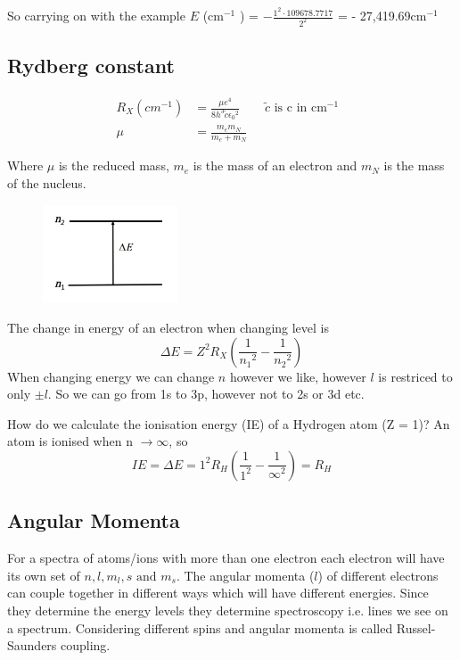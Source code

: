 \documentclass{article}
\newcommand{\cm}{cm\(^{-1}\) }
\begin{document}
    So carrying on with the example $E$ (\cm) = $-\frac{1^2 \cdot 109678.7717}{2^2}$ = - 27,419.69\cm

    \subsection{Rydberg constant}
    \begin{align*}
        R_X (cm^{-1}) &= \frac{\mu e^4}{8h^3\tilde{c}\epsilon{_0}^2} \qquad \text{$\tilde{c}$ is c in \cm} \\
        \mu &= \frac{m_em_N}{m_e + m_N}
    \end{align*}

    Where $\mu$ is the reduced mass, $m_e$ is the mass of an electron and $m_N$ is the mass of the nucleus.

    \begin{figure}[h]
        \centering
        \includegraphics[width=4cm]{delte.jpg}
    \end{figure}

    The change in energy of an electron when changing level is 
    $$\Delta E = Z^2R_X\left(\frac{1}{n{_1} ^2}-\frac{1}{n{_2}^2}\right)$$
    When changing energy we can change $n$ however we like, however $l$ is restriced to only $\pm l$.
    So we can go from 1s to 3p, however not to 2s or 3d etc.

    How do we calculate the ionisation energy (IE) of a Hydrogen atom (Z = 1)? An atom is ionised when n $\rightarrow \infty$, so
    $$IE = \Delta E = 1^2R_H\left(\frac{1}{1^2}-\frac{1}{\infty^2}\right) = R_H$$

    \subsection{Angular Momenta}

    For a spectra of atoms/ions with more than one electron each electron will have its own set of 
    $n, l, m_l, s \text{ and } m_s$. The angular momenta ($l$) of different electrons can couple together in different ways
    which will have different energies. Since they determine the energy levels they determine spectroscopy i.e. lines we see on a spectrum.
    Considering different spins and angular momenta is called Russel-Saunders coupling.
\end{document}
